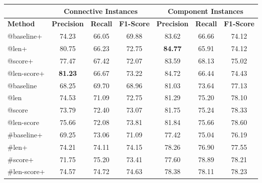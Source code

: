 \begin{table}[ht]
\centering
\begin{tabular}{|l|c|c|c|c|c|c|}
\hline
                            & \multicolumn{3}{c|}{Connective Instances} & \multicolumn{3}{c|}{Component Instances} \\ \hline
\bf Method                  & \bf Precision & \bf Recall & \bf F1-Score  & \bf Precision & \bf Recall & \bf F1-Score \\ \hline
    @baseline+              &     74.23     &     66.05  &     69.88     &     83.62     &     66.66  &     74.12    \\ \hline
    @len+                   &     80.75     &     66.23  &     72.75     & \bf 84.77     &     65.91  &     74.12    \\ \hline
    @score+                 &     77.47     &     67.42  &     72.07     &     83.59     &     68.13  &     75.02    \\ \hline
    @len-score+             & \bf 81.23     &     66.67  &     73.22     &     84.72     &     66.44  &     74.43    \\

\hhline{|=|=|=|=|=|=|=|}

    @baseline               &     68.25     &     69.70  &     68.96     &     81.03     &     73.64  &     77.13    \\ \hline
    @len                    &     74.53     &     71.09  &     72.75     &     81.29     &     75.20  &     78.10    \\ \hline
    @score                  &     73.79     &     72.40  &     73.07     &     81.75     &     75.24  &     78.33    \\ \hline
    @len-score              &     75.66     &     72.08  &     73.81     &     81.84     &     75.66  &     78.60    \\

\hhline{|=|=|=|=|=|=|=|}

   \#baseline+              &     69.25     &     73.06  &     71.09     &     77.42     &     75.04  &     76.19    \\ \hline
   \#len+                   &     74.21     &     74.11  &     74.15     &     78.26     &     76.90  &     77.55    \\ \hline
   \#score+                 &     71.75     &     75.20  &     73.41     &     77.60     &     78.89  &     78.21    \\ \hline
   \#len-score+             &     74.57     &     74.72  &     74.63     &     78.38     &     78.11  &     78.23    \\


\end{tabular}
\end{table}
